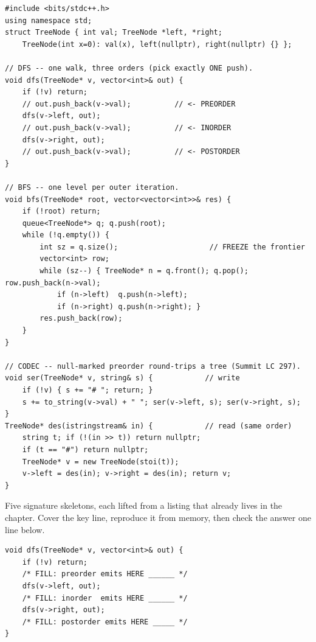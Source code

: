 \begin{lstlisting}[caption={Chapter 3 code kit: the three slots, the frontier, and the codec}, label={lst:c03-kit}]
#include <bits/stdc++.h>
using namespace std;
struct TreeNode { int val; TreeNode *left, *right;
    TreeNode(int x=0): val(x), left(nullptr), right(nullptr) {} };

// DFS -- one walk, three orders (pick exactly ONE push).
void dfs(TreeNode* v, vector<int>& out) {
    if (!v) return;
    // out.push_back(v->val);          // <- PREORDER
    dfs(v->left, out);
    // out.push_back(v->val);          // <- INORDER
    dfs(v->right, out);
    // out.push_back(v->val);          // <- POSTORDER
}

// BFS -- one level per outer iteration.
void bfs(TreeNode* root, vector<vector<int>>& res) {
    if (!root) return;
    queue<TreeNode*> q; q.push(root);
    while (!q.empty()) {
        int sz = q.size();                     // FREEZE the frontier
        vector<int> row;
        while (sz--) { TreeNode* n = q.front(); q.pop(); row.push_back(n->val);
            if (n->left)  q.push(n->left);
            if (n->right) q.push(n->right); }
        res.push_back(row);
    }
}

// CODEC -- null-marked preorder round-trips a tree (Summit LC 297).
void ser(TreeNode* v, string& s) {            // write
    if (!v) { s += "# "; return; }
    s += to_string(v->val) + " "; ser(v->left, s); ser(v->right, s);
}
TreeNode* des(istringstream& in) {            // read (same order)
    string t; if (!(in >> t)) return nullptr;
    if (t == "#") return nullptr;
    TreeNode* v = new TreeNode(stoi(t));
    v->left = des(in); v->right = des(in); return v;
}
\end{lstlisting}


Five signature skeletons, each lifted from a listing that already lives in the chapter.
Cover the key line, reproduce it from memory, then check the answer one line below.

\begin{lstlisting}[caption={Drill 1 -- the three-slot DFS (from \coderef{c03-dfs})}]
void dfs(TreeNode* v, vector<int>& out) {
    if (!v) return;
    /* FILL: preorder emits HERE ______ */
    dfs(v->left, out);
    /* FILL: inorder  emits HERE ______ */
    dfs(v->right, out);
    /* FILL: postorder emits HERE _____ */
}
\end{lstlisting}

